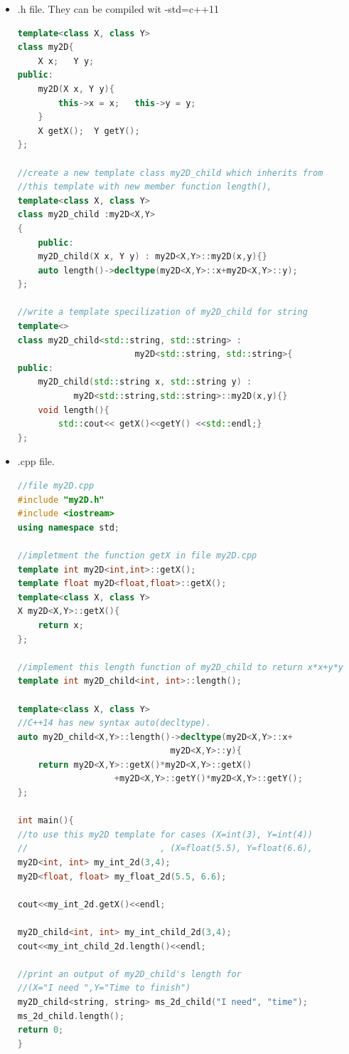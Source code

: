 \documentclass[a4paper,12pt,twoside]{book}
\begin{document}
\begin{itemize}

\item .h file. They can be compiled wit -std=c++11
\begin{lstlisting}[frame=single, language=c++]
template<class X, class Y>
class my2D{
	X x;   Y y;
public:
	my2D(X x, Y y){
		this->x = x;   this->y = y;
	}
	X getX();  Y getY();
};

//create a new template class my2D_child which inherits from
//this template with new member function length(),
template<class X, class Y>
class my2D_child :my2D<X,Y>
{
	public:
	my2D_child(X x, Y y) : my2D<X,Y>::my2D(x,y){}
    auto length()->decltype(my2D<X,Y>::x+my2D<X,Y>::y);	
};

//write a template specilization of my2D_child for string
template<>
class my2D_child<std::string, std::string> :
                       my2D<std::string, std::string>{
public:
	my2D_child(std::string x, std::string y) :
	       my2D<std::string,std::string>::my2D(x,y){}
    void length(){
		std::cout<< getX()<<getY() <<std::endl;}
};
\end{lstlisting}

\item .cpp file.
\begin{lstlisting}[frame=single, language=c++]
//file my2D.cpp
#include "my2D.h"
#include <iostream>
using namespace std;

//impletment the function getX in file my2D.cpp
template int my2D<int,int>::getX();
template float my2D<float,float>::getX();
template<class X, class Y>
X my2D<X,Y>::getX(){
	return x;
};

//implement this length function of my2D_child to return x*x+y*y
template int my2D_child<int, int>::length();

template<class X, class Y>
//C++14 has new syntax auto(decltype).
auto my2D_child<X,Y>::length()->decltype(my2D<X,Y>::x+
                              my2D<X,Y>::y){	
	return my2D<X,Y>::getX()*my2D<X,Y>::getX()
	               +my2D<X,Y>::getY()*my2D<X,Y>::getY();
};

int main(){
//to use this my2D template for cases (X=int(3), Y=int(4))
//                          , (X=float(5.5), Y=float(6.6),
my2D<int, int> my_int_2d(3,4);
my2D<float, float> my_float_2d(5.5, 6.6);

cout<<my_int_2d.getX()<<endl;

my2D_child<int, int> my_int_child_2d(3,4);
cout<<my_int_child_2d.length()<<endl;
	
//print an output of my2D_child's length for
//(X="I need ",Y="Time to finish")
my2D_child<string, string> ms_2d_child("I need", "time");
ms_2d_child.length();
return 0;
}
\end{lstlisting}


\end{itemize}
\end{document}
